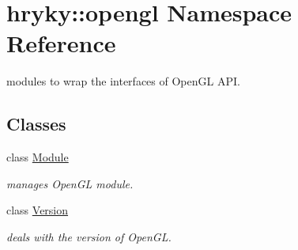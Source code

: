 \hypertarget{namespacehryky_1_1opengl}{\section{hryky\-:\-:opengl Namespace Reference}
\label{namespacehryky_1_1opengl}
}


modules to wrap the interfaces of Open\-G\-L A\-P\-I.  


\subsection*{Classes}
\begin{DoxyCompactItemize}
\item 
class \hyperlink{classhryky_1_1opengl_1_1_module}{Module}
\begin{DoxyCompactList}\small\item\em manages Open\-G\-L module. \end{DoxyCompactList}\item 
class \hyperlink{classhryky_1_1opengl_1_1_version}{Version}
\begin{DoxyCompactList}\small\item\em deals with the version of Open\-G\-L. \end{DoxyCompactList}\end{DoxyCompactItemize}
